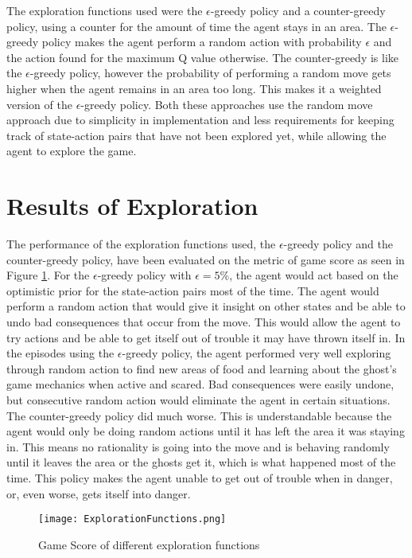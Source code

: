 \documentclass[11pt]{scrartcl}
\begin{document}
The exploration functions used were the $\epsilon$-greedy policy and a counter-greedy policy, using a counter for the amount of time the agent stays in an area. The $\epsilon$-greedy policy makes the agent perform a random action with probability $\epsilon$ and the action found for the maximum Q value otherwise. The counter-greedy is like the $\epsilon$-greedy policy, however the probability of performing a random move gets higher when the agent remains in an area too long. This makes it a weighted version of the $\epsilon$-greedy policy. Both these approaches use the random move approach due to simplicity in implementation and less requirements for keeping track of state-action pairs that have not been explored yet, while allowing the agent to explore the game.

\section{Results of Exploration}

The performance of the exploration functions used, the $\epsilon$-greedy policy and the counter-greedy policy, have been evaluated on the metric of game score as seen in Figure \ref{fig:F2}. For the $\epsilon$-greedy policy with $\epsilon = 5\%$, the agent would act based on the optimistic prior for the state-action pairs most of the time. The agent would perform a random action that would give it insight on other states and be able to undo bad consequences that occur from the move. This would allow the agent to try actions and be able to get itself out of trouble it may have thrown itself in. In the episodes using the $\epsilon$-greedy policy, the agent performed very well exploring through random action to find new areas of food and learning about the ghost's game mechanics when active and scared. Bad consequences were easily undone, but consecutive random action would eliminate the agent in certain situations. The counter-greedy policy did much worse. This is understandable because the agent would only be doing random actions until it has left the area it was staying in. This means no rationality is going into the move and is behaving randomly until it leaves the area or the ghosts get it, which is what happened most of the time. This policy makes the agent unable to get out of trouble when in danger, or, even worse, gets itself into danger. 

\begin{figure}[ht]
\centering	
\texttt{[image: ExplorationFunctions.png]}	
\caption{Game Score of different exploration functions}
\label{fig:F2}
\end{figure}
\end{document}
